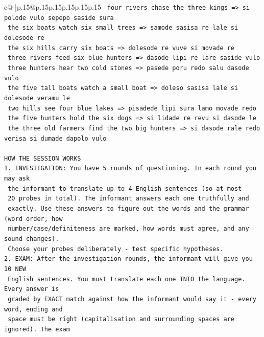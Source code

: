 \documentclass{article}
\begin{document}
{\begin{supertabular}{c@{$\;$}|p{.15\linewidth}@{}p{.15\linewidth}p{.15\linewidth}p{.15\linewidth}p{.15\linewidth}p{.15\linewidth}}
{{{\texttt{    four rivers chase the three kings  =>  si polode vulo sepepo saside sura} \\
\texttt{    the six boats watch six small trees  =>  samode sasisa re lale si dolesode re} \\
\texttt{    the six hills carry six boats  =>  dolesode re vuve si movade re} \\
\texttt{    three rivers feed six blue hunters  =>  dasode lipi re lare saside vulo} \\
\texttt{    three hunters hear two cold stones  =>  pasede poru redo salu dasode vulo} \\
\texttt{    the five tall boats watch a small boat  =>  doleso sasisa lale si dolesode veramu le} \\
\texttt{    two hills see four blue lakes  =>  pisadede lipi sura lamo movade redo} \\
\texttt{    the five hunters hold the six dogs  =>  si lidade re revu si dasode le} \\
\texttt{    the three old farmers find the two big hunters  =>  si dasode rale redo verisa si dumade dapolo vulo} \\
\\ 
\texttt{HOW THE SESSION WORKS} \\
\texttt{1. INVESTIGATION: You have 5 rounds of questioning. In each round you may ask} \\
\texttt{   the informant to translate up to 4 English sentences (so at most} \\
\texttt{   20 probes in total). The informant answers each one truthfully and} \\
\texttt{   exactly. Use these answers to figure out the words and the grammar (word order, how} \\
\texttt{   number/case/definiteness are marked, how words must agree, and any sound changes).} \\
\texttt{   Choose your probes deliberately {-} test specific hypotheses.} \\
\texttt{2. EXAM: After the investigation rounds, the informant will give you 10 NEW} \\
\texttt{   English sentences. You must translate each one INTO the language. Every answer is} \\
\texttt{   graded by EXACT match against how the informant would say it {-} every word, ending and} \\
\texttt{   space must be right (capitalisation and surrounding spaces are ignored). The exam} \\
}}}
\end{supertabular}}
\end{document}
